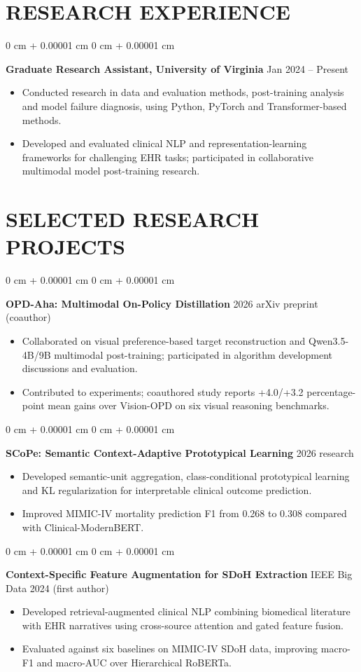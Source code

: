 \documentclass[10pt, letterpaper]{article}
\newenvironment{highlights}{
    \begin{itemize}[
        topsep=0.03 cm,
        parsep=0.03 cm,
        partopsep=0pt,
        itemsep=0pt,
        leftmargin=0 cm + 10pt
    ]
}{
    \end{itemize}
} %
\newenvironment{onecolentry}{
    \begin{adjustwidth}{
        0 cm + 0.00001 cm
    }{
        0 cm + 0.00001 cm
    }
}{
    \end{adjustwidth}
} %
\begin{document}
\section{RESEARCH EXPERIENCE}
\begin{onecolentry}
\textbf{Graduate Research Assistant, University of Virginia} \hfill Jan 2024 -- Present
\begin{highlights}
\item Conducted research in data and evaluation methods, post-training analysis and model failure diagnosis, using Python, PyTorch and Transformer-based methods.
\item Developed and evaluated clinical NLP and representation-learning frameworks for challenging EHR tasks; participated in collaborative multimodal model post-training research.
\end{highlights}
\end{onecolentry}
\section{SELECTED RESEARCH PROJECTS}
\begin{onecolentry}
\textbf{OPD-Aha: Multimodal On-Policy Distillation} \hfill 2026 arXiv preprint (coauthor)
\begin{highlights}
\item Collaborated on visual preference-based target reconstruction and Qwen3.5-4B/9B multimodal post-training; participated in algorithm development discussions and evaluation.
\item Contributed to experiments; coauthored study reports +4.0/+3.2 percentage-point mean gains over Vision-OPD on six visual reasoning benchmarks.
\end{highlights}
\end{onecolentry}
\vspace{0.025 cm}
\begin{onecolentry}
\textbf{SCoPe: Semantic Context-Adaptive Prototypical Learning} \hfill 2026 research
\begin{highlights}
\item Developed semantic-unit aggregation, class-conditional prototypical learning and KL regularization for interpretable clinical outcome prediction.
\item Improved MIMIC-IV mortality prediction F1 from 0.268 to 0.308 compared with Clinical-ModernBERT.
\end{highlights}
\end{onecolentry}
\vspace{0.025 cm}
\begin{onecolentry}
\textbf{Context-Specific Feature Augmentation for SDoH Extraction} \hfill IEEE Big Data 2024 (first author)
\begin{highlights}
\item Developed retrieval-augmented clinical NLP combining biomedical literature with EHR narratives using cross-source attention and gated feature fusion.
\item Evaluated against six baselines on MIMIC-IV SDoH data, improving macro-F1 and macro-AUC over Hierarchical RoBERTa.
\end{highlights}
\end{onecolentry}
\vspace{0.025 cm}
\end{document}
